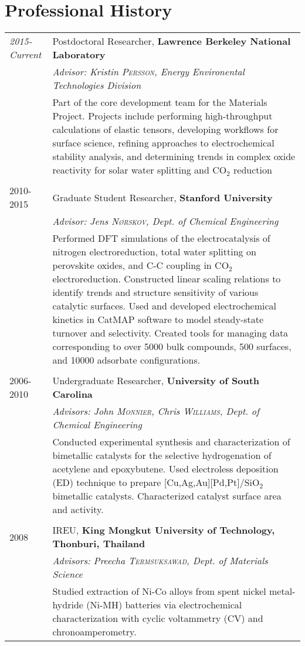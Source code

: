 \documentclass[a4paper,10pt]{article}
\begin{document}
\section{Professional History}
\begin{tabular}{l|p{11cm}}
 \emph{2015-Current} & Postdoctoral Researcher, \textbf{Lawrence Berkeley National Laboratory} \\
 &\emph{Advisor: Kristin \textsc{Persson}, Energy Environental Technologies Division}\\&
 \footnotesize{Part of the core development team for the Materials Project.  Projects include performing 
 high-throughput calculations of elastic tensors, developing workflows for surface science, refining approaches 
 to electrochemical stability analysis, and determining trends in complex oxide reactivity for solar water splitting
 and CO$_2$ reduction}\\\multicolumn{2}{c}{} \\
 \textsc{2010-2015} & Graduate Student Researcher, \textbf{Stanford University}\\&\emph{Advisor: Jens \textsc{N\o rskov}, Dept. of Chemical Engineering}\\&\footnotesize{Performed DFT simulations of the electrocatalysis of nitrogen electroreduction, total water splitting on perovskite oxides, and C-C coupling in CO$_2$ electroreduction.  Constructed linear scaling relations to identify trends and structure sensitivity of various catalytic surfaces.  Used and developed electrochemical kinetics in CatMAP software to model steady-state turnover and selectivity.  Created tools for managing data corresponding to over 5000 bulk compounds, 500 surfaces, and 10000 adsorbate configurations.}\\\multicolumn{2}{c}{} \\
\textsc{2006-2010} & Undergraduate Researcher, \textbf{University of South Carolina}\\&\emph{Advisors: John \textsc{Monnier}, Chris \textsc{Williams}, Dept. of Chemical Engineering}\\&\footnotesize{Conducted experimental synthesis and characterization of bimetallic catalysts for the selective hydrogenation of acetylene and epoxybutene.  Used electroless deposition (ED) technique to prepare [Cu,Ag,Au][Pd,Pt]/SiO$_2$ bimetallic catalysts.  Characterized catalyst surface area and activity.}\\ \multicolumn{2}{c}{} \\
\textsc{2008} & IREU, \textbf{King Mongkut University of Technology, Thonburi, Thailand}\\&\emph{Advisors: Preecha \textsc{Termsuksawad}, Dept. of Materials Science}\\&\footnotesize{Studied extraction of Ni-Co alloys from spent nickel metal-hydride (Ni-MH) batteries via electrochemical characterization with cyclic voltammetry (CV) and chronoamperometry.}
\end{tabular}
\vspace{0.2in}
\end{document}
